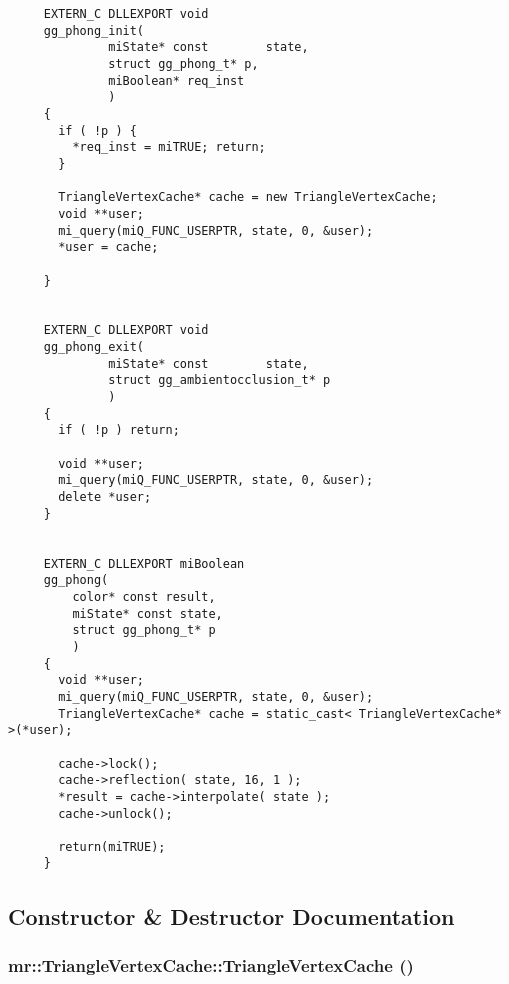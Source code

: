 \footnotesize\begin{verbatim}     EXTERN_C DLLEXPORT void
     gg_phong_init(
              miState* const        state,
              struct gg_phong_t* p,
              miBoolean* req_inst
              )
     {
       if ( !p ) {  
         *req_inst = miTRUE; return;
       }
   
       TriangleVertexCache* cache = new TriangleVertexCache;
       void **user;
       mi_query(miQ_FUNC_USERPTR, state, 0, &user);
       *user = cache;
   
     }
   
   
     EXTERN_C DLLEXPORT void
     gg_phong_exit(
              miState* const        state,
              struct gg_ambientocclusion_t* p
              )
     {
       if ( !p ) return;
   
       void **user;
       mi_query(miQ_FUNC_USERPTR, state, 0, &user);
       delete *user;
     }
   
   
     EXTERN_C DLLEXPORT miBoolean 
     gg_phong(
         color* const result,
         miState* const state,
         struct gg_phong_t* p
         )
     {
       void **user;
       mi_query(miQ_FUNC_USERPTR, state, 0, &user);
       TriangleVertexCache* cache = static_cast< TriangleVertexCache* >(*user);
   
       cache->lock();
       cache->reflection( state, 16, 1 );
       *result = cache->interpolate( state );
       cache->unlock();
   
       return(miTRUE);
     }
\end{verbatim}
\normalsize




\subsection{Constructor \& Destructor Documentation}
\subsubsection{\setlength{\rightskip}{0pt plus 5cm}mr::Triangle\-Vertex\-Cache::Triangle\-Vertex\-Cache ()\hspace{0.3cm}{\tt  [inline]}}\label{classmr_1_1TriangleVertexCache_a0}


